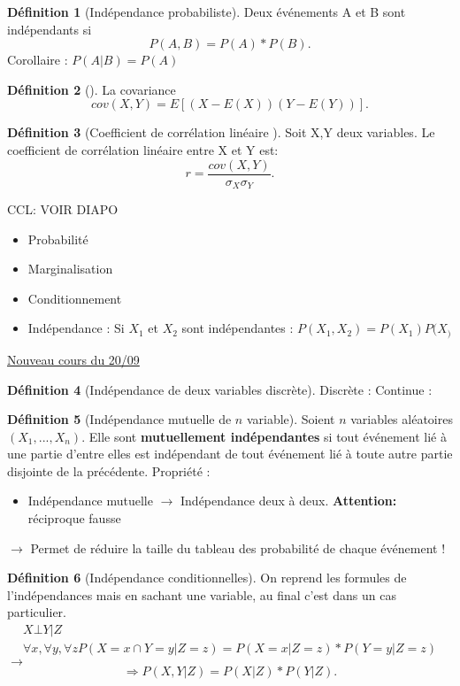 \documentclass{article}
\theoremstyle{plain}%
\theoremstyle{definition}
\newtheorem{defn}{Définition}[section]
\theoremstyle{remark}
\begin{document}
\begin{defn}[Indépendance probabiliste]
    Deux événements A et B sont indépendants si 
    \[
        P(A,B) = P(A) * P(B)
    .\]
    Corollaire : $ P(A|B) = P(A) $ 
\end{defn}

\begin{defn}[]
    La covariance 
    \[
        cov(X,Y) = E[(X-E(X))(Y-E(Y))]
    .\]
\end{defn}

\begin{defn}[Coefficient de corrélation linéaire ]
    Soit X,Y deux variables. Le coefficient de corrélation linéaire entre X et Y est:
    \[
        r = \frac{cov(X,Y)}{\sigma _X \sigma _Y}
    .\]
\end{defn}

CCL: VOIR DIAPO
\begin{itemize} 
    \item Probabilité
    \item Marginalisation
    \item Conditionnement
    \item Indépendance : Si $ X_1 $ et $ X_2 $ sont indépendantes : $ P(X_1, X_2) = P(X_1)P(X_) $ 
\end{itemize}

\underline{Nouveau cours du 20/09} \\
\begin{defn}[Indépendance de deux variables discrète]
    Discrète : 
    Continue : 
\end{defn}
\begin{defn}[Indépendance mutuelle de $ n $ variable]
    Soient $ n $ variables aléatoires $ (X_1, ..., X_n) $. Elle sont \textbf{mutuellement indépendantes} si tout événement lié à une partie d'entre elles est indépendant de tout événement lié à toute autre partie disjointe de la précédente.
    Propriété : \begin{itemize}
        \item Indépendance mutuelle $\rightarrow$ Indépendance deux à deux. \textbf{Attention:} réciproque fausse
    \end{itemize}

    $\rightarrow$ Permet de réduire la taille du tableau des probabilité de chaque événement !
\end{defn}

\begin{defn}[Indépendance conditionnelles]
    On reprend les formules de l'indépendances mais en sachant une variable, au final c'est dans un cas particulier. 
    \begin{align*}
        X \bot Y | Z \\
        \forall x, \forall y, \forall z P(X=x \cap  Y=y | Z = z) = P(X=x|Z=z) * P(Y=y|Z=z)
    \end{align*}
    $\rightarrow$ 
    \[
        \Rightarrow P(X,Y | Z) = P(X|Z)*P(Y|Z)
    .\]
\end{defn}
\end{document}

